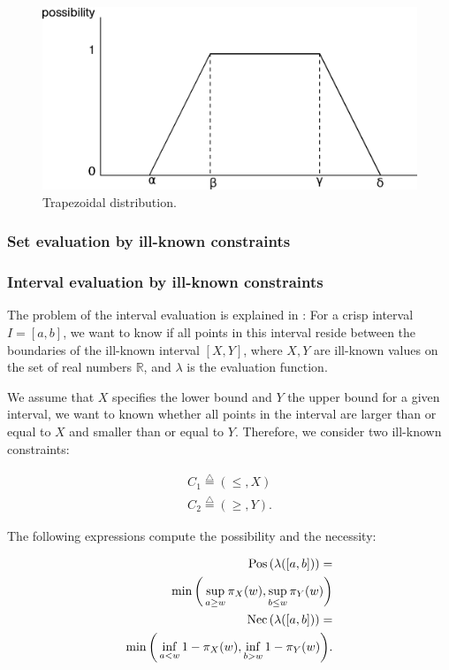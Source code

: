 \begin{figure}[h!]
  \centering
  \includegraphics[scale=0.4]{graphs/trapezoidalDistribution.eps}
  \caption{Trapezoidal distribution.}
  \label{fig:trapezoidal}
\end{figure}

\subsubsection{Set evaluation by ill-known constraints}

\subsubsection{Interval evaluation by ill-known constraints}
The problem of the interval evaluation is explained in \cite{Pon11}: For a crisp interval $I = \left[ a, b \right]$, we want to know if all points in this interval reside between the boundaries of the ill-known interval $\left[ X , Y \right]$, where $X,Y$ are ill-known values on the set of real numbers $\mathbb{R}$, and $\lambda$ is the evaluation function.

We assume that $X$ specifies the lower bound and $Y$ the upper bound for a given interval, we want to known whether all points in the interval are larger than or equal to $X$ and smaller than or equal to $Y$. Therefore, we consider two ill-known constraints:

\begin{eqnarray}
C_1\stackrel{\triangle}{=}\left(\leq,X\right)\\
C_2\stackrel{\triangle}{=}\left(\geq,Y\right).
\end{eqnarray}

The following expressions compute the possibility and the necessity: 

\begin{eqnarray}
\label{eq:interval-pos}
\operatorname{Pos}\left(\lambda([a,b])\right)=\\
\nonumber
\min\bigg(\sup_{a\geq w}\pi_{X}(w),\sup_{b\leq w}\pi_{Y}(w)\bigg)\\
\label{eq:interval-nec}
\operatorname{Nec}\left(\lambda([a,b])\right)=\\
\nonumber
\min\bigg(\inf_{a<w}1-\pi_{X}(w),\inf_{b>w}1-\pi_{Y}(w)\bigg).
\end{eqnarray}

